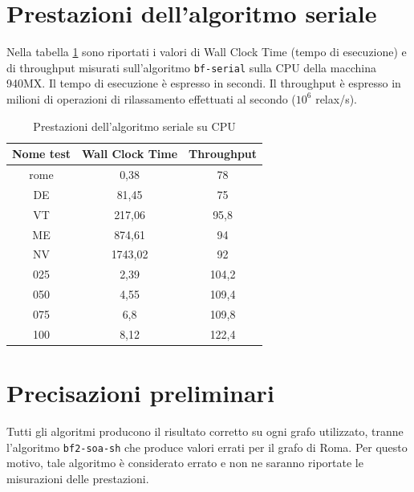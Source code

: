 \documentclass[12pt,a4paper,oneside]{book}
\begin{document}
	\section{Prestazioni dell'algoritmo seriale}
	Nella tabella \ref{tab:performance_serial} sono riportati i valori di Wall Clock Time (tempo di esecuzione) e di throughput misurati sull'algoritmo \texttt{bf-serial} sulla CPU della macchina 940MX. Il tempo di esecuzione è espresso in secondi. Il throughput è espresso in milioni di operazioni di rilassamento effettuati al secondo ($10^6$ relax/s).
	
	\begin{table}[!ht]
		\centering
		\begin{tabular}{|c|c|c|}
			\hline
			\textbf{Nome test} & \textbf{Wall Clock Time} & \textbf{Throughput} \\ \hline
			       rome        &           0,38           &         78          \\ \hline
			        DE         &          81,45           &         75          \\ \hline
			        VT         &          217,06          &        95,8         \\ \hline
			        ME         &          874,61          &         94          \\ \hline
			        NV         &         1743,02          &         92          \\ \hline
			       025         &           2,39           &        104,2        \\ \hline
			       050         &           4,55           &        109,4        \\ \hline
			       075         &           6,8            &        109,8        \\ \hline
			       100         &           8,12           &        122,4        \\ \hline
		\end{tabular}
		\caption{Prestazioni dell'algoritmo seriale su CPU}
		\label{tab:performance_serial}
	\end{table}

	\section{Precisazioni preliminari}
	Tutti gli algoritmi producono il risultato corretto su ogni grafo utilizzato, tranne l'algoritmo \texttt{bf2-soa-sh} che produce valori errati per il grafo di Roma. Per questo motivo, tale algoritmo è considerato errato e non ne saranno riportate le misurazioni delle prestazioni.
	
\end{document}
